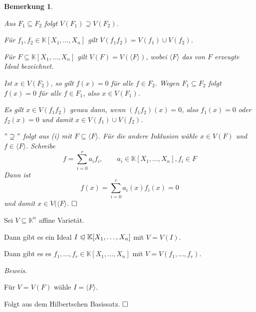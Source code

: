 \documentclass[11pt]{book}
\newtheorem{remark}[theorem]{Bemerkung}
\theoremstyle{nonumberbreak}
\newenvironment{pr}[1][]{\ifthenelse{\equal{#1}{}}{\proof}{\proof[#1]}\rm}{\endproof}
\newenvironment{bemdefin}[1][]{\ifthenelse{\equal{#1}{}}{\bemdefini}{\bemdefini[#1]}\rm}{\endbemdefini}
\newenvironment{folg}[1][]{\ifthenelse{\equal{#1}{}}{\folger}{\folger[#1]}\rm}{\endfolger}
\begin{document}
\begin{spacing}{1.3}
\begin{remark}
\begin{compactenum}
\item Aus $F_1 \subseteq F_2$ folgt $V(F_1) \supseteq V(F_2)$.
\item Für $f_1, f_2 \in \mathbb{K}[X_1, \ldots, X_n]$ gilt $V(f_1f_2)=V(f_1) \cup V(f_2)$.
\item Für $F \subseteq \mathbb{K}[X_1, \ldots, X_n]$ gilt $V(F)=V(\langle F\rangle )$, wobei $\langle F \rangle$ das von $F$ erzeugte Ideal bezeichnet.
\end{compactenum}
\begin{pr}
\begin{compactenum}
\item Ist $x \in V(F_2)$, so gilt $f(x) = 0$ für alle $f \in F_2$. Wegen $F_1 \subseteq F_2$ folgt $f(x)=0$ für alle $f \in F_1$, also $x \in V(F_1)$.
\item Es gilt $x \in V(f_1f_2)$ genau dann, wenn $(f_1f_2)(x)=0$, also $f_1(x)=0$ oder $f_2(x)=0$ und damit $x \in V(f_1) \cup V(f_2)$. 
\item $"\supseteq"$ folgt aus (i) mit $F \subseteq \langle F \rangle$. Für die andere Inklusion wähle $x \in V(F)$ und $f \in \langle F \rangle$. Schreibe
$$f=\sum_{i=0}^r a_i f_i, \qquad a_i \in \mathbb{K}[X_1, \ldots, X_n], f_i \in F$$
Dann ist
$$f(x)=\sum_{i=0}^r a_i(x) f_i(x)=0$$
und damit $x \in V(\langle F \rangle$. $\hfill \Box$
\end{compactenum}
\end{pr}
\end{remark}


\begin{folg} %

Sei $V \subseteq \mathbb{K}^n$ affine Varietät.
\begin{compactenum}
\item Dann gibt es ein Ideal $I \trianglelefteqslant \mathbb{K}[X_1, \ldots, X_n]$ mit $V=V(I)$.
\item Dann gibt es es $f_1, \ldots, f_r \in \mathbb{K}[X_1,\ldots, X_n]$ mit $V=V(f_1, \ldots, f_r)$.
\end{compactenum}
\textit{Beweis.}
\begin{compactenum}
\item Für $V=V(F)$ wähle $I=\langle F \rangle$.
\item Folgt aus dem Hilbertschen Basissatz. $\hfill \Box$
\end{compactenum}
\end{folg}

\begin{bemdefin} %


\end{bemdefin}
\end{spacing}
\end{document}
